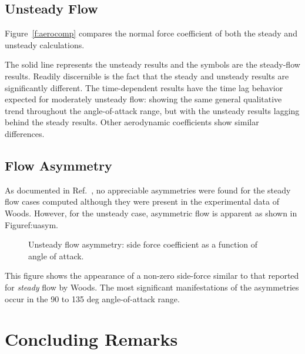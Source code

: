 \documentclass[cover]{aiaa}%
\begin{document}
\subsection{Unsteady Flow}

Figure~\ref{f:aerocomp} compares the normal force coefficient of
both the steady and unsteady calculations.
\begin{figure*}
  \caption{Comparison of steady and unsteady normal force
    coefficients as a function of angle of attack.  {\em Example
    of a figure that spans both columns.  The danger is that the
    figure numbering may be out of order since the single-column
    float and double-column float counters are not connected when
    it comes to determining placement order.  You can correct this
    known ``feature'' of \LaTeX{} by using the \texttt{fix2col} package.}}
 \label{f:aerocomp}
\end{figure*}
The solid line represents the unsteady results and the symbols
are the steady-flow results.  Readily discernible is the fact
that the steady and unsteady results are significantly different.
The time-dependent results have the time lag behavior expected
for moderately unsteady flow: showing the same general
qualitative trend throughout the angle-of-attack range, but with
the unsteady results lagging behind the steady results. Other
aerodynamic coefficients show similar
differences.\cite{kleb:96cp}

\subsection{Flow Asymmetry}

As documented in Ref.~, no appreciable
asymmetries were found for the steady flow cases computed
although they were present in the experimental data of
Woods\cite{woods:95cp}.  However, for the unsteady case,
asymmetric flow is apparent as shown in Figure{f:uasym}.
\begin{figure}[t]
  \caption{Unsteady flow asymmetry: side force coefficient as a
    function of angle of attack.}
  \label{f:uasym}
\end{figure}
This figure shows the appearance of a non-zero side-force similar
to that reported for {\em steady} flow by Woods\cite{woods:95cp}.
The most significant manifestations of the asymmetries occur in
the 90 to 135 deg angle-of-attack range.

\section{Concluding Remarks}
\end{document}
